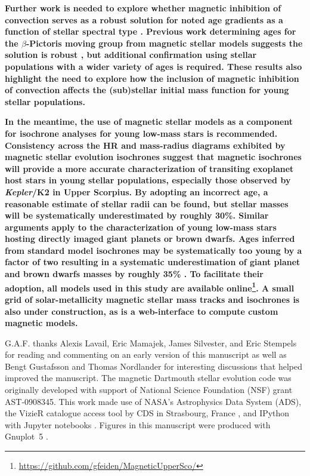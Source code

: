 \documentclass{aa}
\begin{document}
{\bf Further work is needed to explore whether magnetic inhibition of convection serves as a robust solution for noted age gradients as a function of stellar spectral type \citep[e.g.,][]{Naylor2009, Herczeg2015}. Previous work determining ages for the $\beta$-Pictoris moving group from magnetic stellar models suggests the solution is robust \citep{MM10, Malo2014, Binks2016}, but additional confirmation using stellar populations with a wider variety of ages is required. These results also highlight the need to explore how the inclusion of magnetic inhibition of convection affects the (sub)stellar initial mass function for young stellar populations.}

{\bf In the meantime, the use of magnetic stellar models as a component for isochrone analyses for young low-mass stars is recommended. Consistency across the HR and mass-radius diagrams exhibited by magnetic stellar evolution isochrones suggest that magnetic isochrones will provide a more accurate characterization of transiting exoplanet host stars in young stellar populations, especially those observed by \emph{Kepler}/K2 in Upper Scorpius. By adopting an incorrect age, a reasonable estimate of stellar radii can be found, but stellar masses will be systematically underestimated by roughly 30\%. Similar arguments apply to the characterization of young low-mass stars hosting directly imaged giant planets or brown dwarfs. Ages inferred from standard model isochrones may be systematically too young by a factor of two resulting in a systematic underestimation of giant planet and brown dwarfs masses by roughly 35\% \citep{Baraffe2003}. To facilitate their adoption, all models used in this study are available online\footnote{\url{https://github.com/gfeiden/MagneticUpperSco/}}. A small grid of solar-metallicity magnetic stellar mass tracks and isochrones is also under construction, as is a web-interface to compute custom magnetic models.}

\begin{acknowledgements}
G.A.F. thanks Alexis Lavail, Eric Mamajek, James Silvester, and Eric Stempels for reading and commenting on an early version of this manuscript as well as Bengt Gustafsson and Thomas Nordlander for interesting discussions that helped improved the manuscript. The magnetic Dartmouth stellar evolution code was originally developed with support of National Science Foundation (NSF) grant AST-0908345. This work made use of NASA's Astrophysics Data System (ADS), the VizieR catalogue access tool by CDS in Strasbourg, France \citep{Ochsenbein2000}, and IPython with Jupyter notebooks \citep{Perez2007}. Figures in this manuscript were produced with Gnuplot~5 \citep{Gnuplot5.0}.
\end{acknowledgements}


\end{document}
